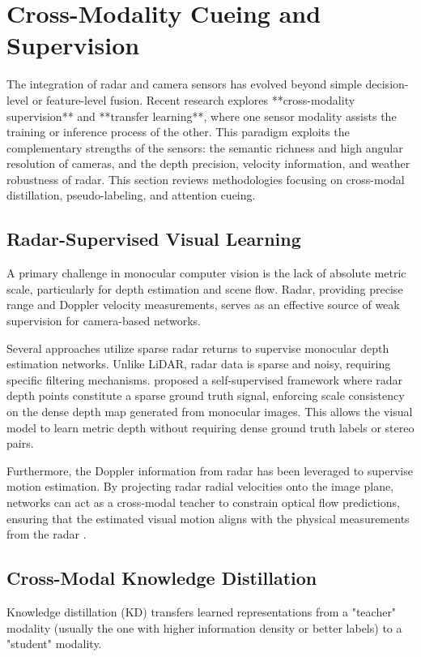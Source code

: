 \section{Cross-Modality Cueing and Supervision}

The integration of radar and camera sensors has evolved beyond simple decision-level or feature-level fusion. Recent research explores **cross-modality supervision** and **transfer learning**, where one sensor modality assists the training or inference process of the other. This paradigm exploits the complementary strengths of the sensors: the semantic richness and high angular resolution of cameras, and the depth precision, velocity information, and weather robustness of radar. This section reviews methodologies focusing on cross-modal distillation, pseudo-labeling, and attention cueing.

\subsection{Radar-Supervised Visual Learning}
A primary challenge in monocular computer vision is the lack of absolute metric scale, particularly for depth estimation and scene flow. Radar, providing precise range and Doppler velocity measurements, serves as an effective source of weak supervision for camera-based networks.

Several approaches utilize sparse radar returns to supervise monocular depth estimation networks. Unlike LiDAR, radar data is sparse and noisy, requiring specific filtering mechanisms. \cite{Lin2020} proposed a self-supervised framework where radar depth points constitute a sparse ground truth signal, enforcing scale consistency on the dense depth map generated from monocular images. This allows the visual model to learn metric depth without requiring dense ground truth labels or stereo pairs.

Furthermore, the Doppler information from radar has been leveraged to supervise motion estimation. By projecting radar radial velocities onto the image plane, networks can act as a cross-modal teacher to constrain optical flow predictions, ensuring that the estimated visual motion aligns with the physical measurements from the radar \cite{Alonso2021}.

\subsection{Cross-Modal Knowledge Distillation}
Knowledge distillation (KD) transfers learned representations from a "teacher" modality (usually the one with higher information density or better labels) to a "student" modality.

